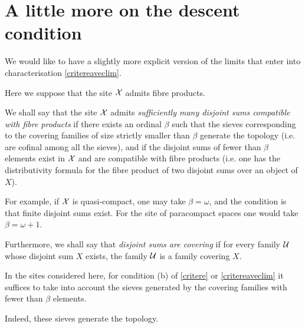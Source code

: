 %

\clearpage
\section{A little more on the descent condition}
\label{peupluspage}

We would like to have a slightly more explicit version of the limits that
enter into characterisation \ref{critereaveclim}.

Here we suppose that the site ${\cal X}$ admits fibre products.

We shall say that the site ${\cal X}$ admits {\em sufficiently many disjoint sums
compatible with fibre products} if there exists an ordinal $\beta$ such that
the sieves corresponding to the covering families of size strictly smaller
than $\beta$ generate the topology (i.e. are cofinal among all the sieves), and
if the disjoint sums of fewer than $\beta$ elements exist in ${\cal X}$ and are
compatible with fibre products (i.e. one has the distributivity formula for the
fibre product of two disjoint sums over an object of $X$).

For example, if ${\cal X}$ is quasi-compact, one may take $\beta = \omega$, and the
condition is that finite disjoint sums exist. For the site of paracompact
spaces one would take $\beta = \omega +1$.

Furthermore, we shall say that {\em disjoint sums are covering} if for every
family ${\cal U}$ whose disjoint sum $X$ exists, the family ${\cal U}$ is a family
covering $X$.

\begin{remark}
\label{casuffit}
In the sites considered here, for condition (b) of \ref{critere} or
\ref{critereaveclim} it suffices to take into account the sieves generated by
the covering families with fewer than $\beta$ elements.
\end{remark}
Indeed, these sieves generate the topology.

